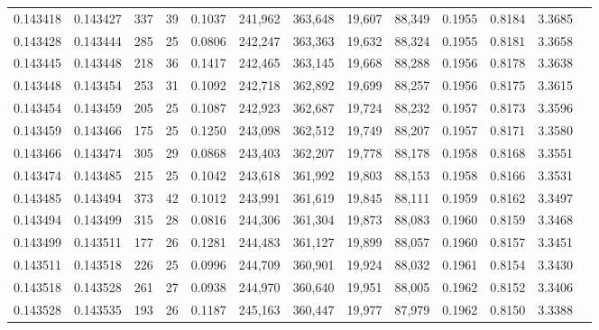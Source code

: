 \begin{tabular}{rrrrrrrrrrrrr}
0.143418 & 0.143427 & 337 &  39 &                                     0.1037 & 241,962 & 363,648 &  19,607 &  88,349 & 0.1955 & 0.8184 & 3.3685 \\
0.143428 & 0.143444 & 285 &  25 &                                     0.0806 & 242,247 & 363,363 &  19,632 &  88,324 & 0.1955 & 0.8181 & 3.3658 \\
0.143445 & 0.143448 & 218 &  36 &                                     0.1417 & 242,465 & 363,145 &  19,668 &  88,288 & 0.1956 & 0.8178 & 3.3638 \\
0.143448 & 0.143454 & 253 &  31 &                                     0.1092 & 242,718 & 362,892 &  19,699 &  88,257 & 0.1956 & 0.8175 & 3.3615 \\
0.143454 & 0.143459 & 205 &  25 &                                     0.1087 & 242,923 & 362,687 &  19,724 &  88,232 & 0.1957 & 0.8173 & 3.3596 \\
0.143459 & 0.143466 & 175 &  25 &                                     0.1250 & 243,098 & 362,512 &  19,749 &  88,207 & 0.1957 & 0.8171 & 3.3580 \\
0.143466 & 0.143474 & 305 &  29 &                                     0.0868 & 243,403 & 362,207 &  19,778 &  88,178 & 0.1958 & 0.8168 & 3.3551 \\
0.143474 & 0.143485 & 215 &  25 &                                     0.1042 & 243,618 & 361,992 &  19,803 &  88,153 & 0.1958 & 0.8166 & 3.3531 \\
0.143485 & 0.143494 & 373 &  42 &                                     0.1012 & 243,991 & 361,619 &  19,845 &  88,111 & 0.1959 & 0.8162 & 3.3497 \\
0.143494 & 0.143499 & 315 &  28 &                                     0.0816 & 244,306 & 361,304 &  19,873 &  88,083 & 0.1960 & 0.8159 & 3.3468 \\
0.143499 & 0.143511 & 177 &  26 &                                     0.1281 & 244,483 & 361,127 &  19,899 &  88,057 & 0.1960 & 0.8157 & 3.3451 \\
0.143511 & 0.143518 & 226 &  25 &                                     0.0996 & 244,709 & 360,901 &  19,924 &  88,032 & 0.1961 & 0.8154 & 3.3430 \\
0.143518 & 0.143528 & 261 &  27 &                                     0.0938 & 244,970 & 360,640 &  19,951 &  88,005 & 0.1962 & 0.8152 & 3.3406 \\
0.143528 & 0.143535 & 193 &  26 &                                     0.1187 & 245,163 & 360,447 &  19,977 &  87,979 & 0.1962 & 0.8150 & 3.3388 \\

\end{tabular}

